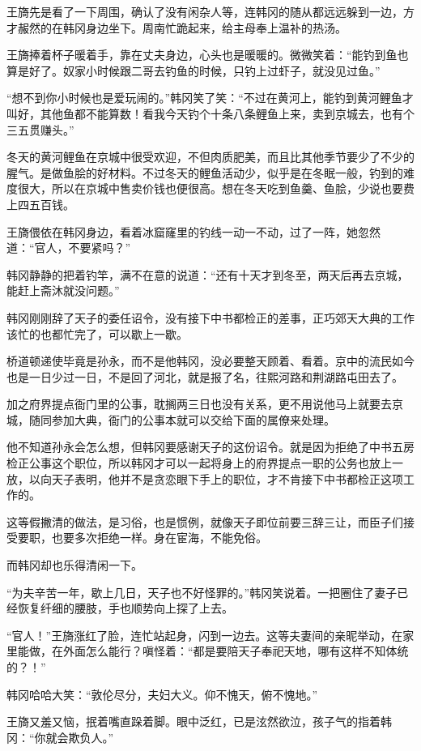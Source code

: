 王旖先是看了一下周围，确认了没有闲杂人等，连韩冈的随从都远远躲到一边，方才赧然的在韩冈身边坐下。周南忙跪起来，给主母奉上温补的热汤。

王旖捧着杯子暖着手，靠在丈夫身边，心头也是暖暖的。微微笑着：“能钓到鱼也算是好了。奴家小时候跟二哥去钓鱼的时候，只钓上过虾子，就没见过鱼。”

“想不到你小时候也是爱玩闹的。”韩冈笑了笑：“不过在黄河上，能钓到黄河鲤鱼才叫好，其他鱼都不能算数！看我今天钓个十条八条鲤鱼上来，卖到京城去，也有个三五贯赚头。”

冬天的黄河鲤鱼在京城中很受欢迎，不但肉质肥美，而且比其他季节要少了不少的腥气。是做鱼脍的好材料。不过冬天的鲤鱼活动少，似乎是在冬眠一般，钓到的难度很大，所以在京城中售卖价钱也便很高。想在冬天吃到鱼羹、鱼脍，少说也要费上四五百钱。

王旖偎依在韩冈身边，看着冰窟窿里的钓线一动一不动，过了一阵，她忽然道：“官人，不要紧吗？”

韩冈静静的把着钓竿，满不在意的说道：“还有十天才到冬至，两天后再去京城，能赶上斋沐就没问题。”

韩冈刚刚辞了天子的委任诏令，没有接下中书都检正的差事，正巧郊天大典的工作该忙的也都忙完了，可以歇上一歇。

桥道顿递使毕竟是孙永，而不是他韩冈，没必要整天顾着、看着。京中的流民如今也是一日少过一日，不是回了河北，就是报了名，往熙河路和荆湖路屯田去了。

加之府界提点衙门里的公事，耽搁两三日也没有关系，更不用说他马上就要去京城，随同参加大典，衙门的公事本就可以交给下面的属僚来处理。

他不知道孙永会怎么想，但韩冈要感谢天子的这份诏令。就是因为拒绝了中书五房检正公事这个职位，所以韩冈才可以一起将身上的府界提点一职的公务也放上一放，以向天子表明，他并不是贪恋眼下手上的职位，才不肯接下中书都检正这项工作的。

这等假撇清的做法，是习俗，也是惯例，就像天子即位前要三辞三让，而臣子们接受要职，也要多次拒绝一样。身在宦海，不能免俗。

而韩冈却也乐得清闲一下。

“为夫辛苦一年，歇上几日，天子也不好怪罪的。”韩冈笑说着。一把圈住了妻子已经恢复纤细的腰肢，手也顺势向上探了上去。

“官人！”王旖涨红了脸，连忙站起身，闪到一边去。这等夫妻间的亲昵举动，在家里能做，在外面怎么能行？嗔怪着：“都是要陪天子奉祀天地，哪有这样不知体统的？！”

韩冈哈哈大笑：“敦伦尽分，夫妇大义。仰不愧天，俯不愧地。”

王旖又羞又恼，抿着嘴直跺着脚。眼中泛红，已是泫然欲泣，孩子气的指着韩冈：“你就会欺负人。”

